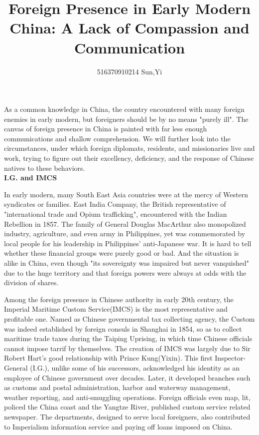 \documentclass[11pt]{article}
\author{516370910214 Sun,Yi}
\title{Foreign Presence in Early Modern China: A Lack of Compassion and Communication}
\begin{document}
\maketitle
\begin{spacing}{2.0}
\paragraph{}
As a common knowledge in China, the country encountered with many foreign enemies in early modern, but foreigners should be by no means "purely ill". The canvas of foreign presence in China is painted with far less enough communications and shallow comprehension. We will further look into the circumstances, under which foreign diplomats, residents, and missionaries live and work, trying to figure out their excellency, deficiency, and the response of Chinese natives to these behaviors.
\\
\textbf{I.G. and IMCS}

In early modern, many South East Asia countries were at the mercy of Western syndicates or families. 
East India Company, the British representative of "international trade and Opium trafficking", encountered with the Indian Rebellion in 1857.\autocite{The-Opium-War}
The family of General Douglas MacArthur also monopolized industry, agriculture, and even army in Philippines, yet was commemorated by local people for his leadership in Philippines' anti-Japanese war. 
It is hard to tell whether these financial groups were purely good or bad. 
And the situation is alike in China, even though "its sovereignty was impaired but never vanquished" due to the huge territory and that foreign powers were always at odds with the division of shares\autocite{Foreign-Presence-in-China}. 

Among the foreign presence in Chinese authority in early 20th century, the Imperial Maritime Custom Service(IMCS) is the most representative and profitable one. Named as Chinese governmental tax collecting agency, the Custom was indeed established by foreign consuls in Shanghai in 1854, so as to collect maritime trade taxes during the Taiping Uprising, in which time Chinese officials cannot impose tarrif by themselves. The creation of IMCS was largely due to Sir Robert Hart's good relationship with Prince Kung(Yixin).\autocite{Robert-Hart} This first Inspector-General (I.G.), unlike some of his successors, acknowledged his identity as an employee of Chinese government over decades. Later, it developed branches such as customs and postal administration, harbor and waterway management, weather reporting, and anti-smuggling operations. Foreign officials even map, lit, policed the China coast and the Yangtze River, published custom service related newspaper. The departments, designed to serve local foreigners, also contributed to Imperialism information service and paying off loans imposed on China.


\end{spacing}
\end{document}
